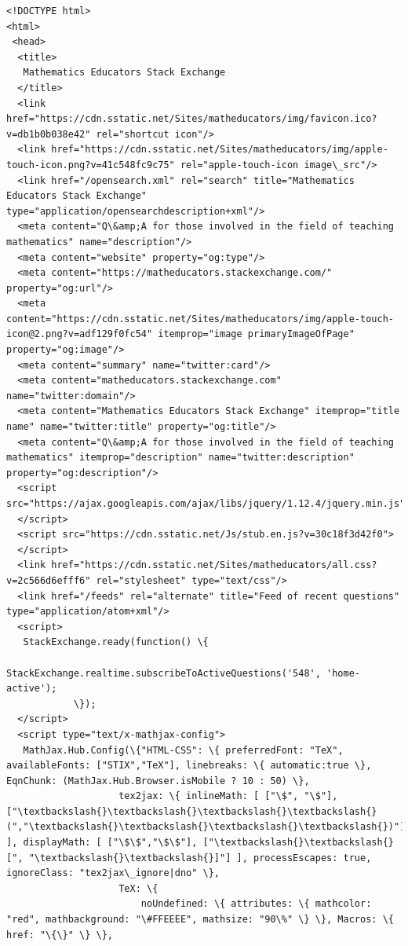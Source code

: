 \documentclass[11pt]{article}
\begin{document}
    \begin{Verbatim}[commandchars=\\\{\}]
<!DOCTYPE html>
<html>
 <head>
  <title>
   Mathematics Educators Stack Exchange
  </title>
  <link href="https://cdn.sstatic.net/Sites/matheducators/img/favicon.ico?v=db1b0b038e42" rel="shortcut icon"/>
  <link href="https://cdn.sstatic.net/Sites/matheducators/img/apple-touch-icon.png?v=41c548fc9c75" rel="apple-touch-icon image\_src"/>
  <link href="/opensearch.xml" rel="search" title="Mathematics Educators Stack Exchange" type="application/opensearchdescription+xml"/>
  <meta content="Q\&amp;A for those involved in the field of teaching mathematics" name="description"/>
  <meta content="website" property="og:type"/>
  <meta content="https://matheducators.stackexchange.com/" property="og:url"/>
  <meta content="https://cdn.sstatic.net/Sites/matheducators/img/apple-touch-icon@2.png?v=adf129f0fc54" itemprop="image primaryImageOfPage" property="og:image"/>
  <meta content="summary" name="twitter:card"/>
  <meta content="matheducators.stackexchange.com" name="twitter:domain"/>
  <meta content="Mathematics Educators Stack Exchange" itemprop="title name" name="twitter:title" property="og:title"/>
  <meta content="Q\&amp;A for those involved in the field of teaching mathematics" itemprop="description" name="twitter:description" property="og:description"/>
  <script src="https://ajax.googleapis.com/ajax/libs/jquery/1.12.4/jquery.min.js">
  </script>
  <script src="https://cdn.sstatic.net/Js/stub.en.js?v=30c18f3d42f0">
  </script>
  <link href="https://cdn.sstatic.net/Sites/matheducators/all.css?v=2c566d6efff6" rel="stylesheet" type="text/css"/>
  <link href="/feeds" rel="alternate" title="Feed of recent questions" type="application/atom+xml"/>
  <script>
   StackExchange.ready(function() \{
                StackExchange.realtime.subscribeToActiveQuestions('548', 'home-active');
            \});
  </script>
  <script type="text/x-mathjax-config">
   MathJax.Hub.Config(\{"HTML-CSS": \{ preferredFont: "TeX", availableFonts: ["STIX","TeX"], linebreaks: \{ automatic:true \}, EqnChunk: (MathJax.Hub.Browser.isMobile ? 10 : 50) \},
                    tex2jax: \{ inlineMath: [ ["\$", "\$"], ["\textbackslash{}\textbackslash{}\textbackslash{}\textbackslash{}(","\textbackslash{}\textbackslash{}\textbackslash{}\textbackslash{})"] ], displayMath: [ ["\$\$","\$\$"], ["\textbackslash{}\textbackslash{}[", "\textbackslash{}\textbackslash{}]"] ], processEscapes: true, ignoreClass: "tex2jax\_ignore|dno" \},
                    TeX: \{ 
                        noUndefined: \{ attributes: \{ mathcolor: "red", mathbackground: "\#FFEEEE", mathsize: "90\%" \} \}, Macros: \{ href: "\{\}" \} \},

\end{Verbatim}
\end{document}

